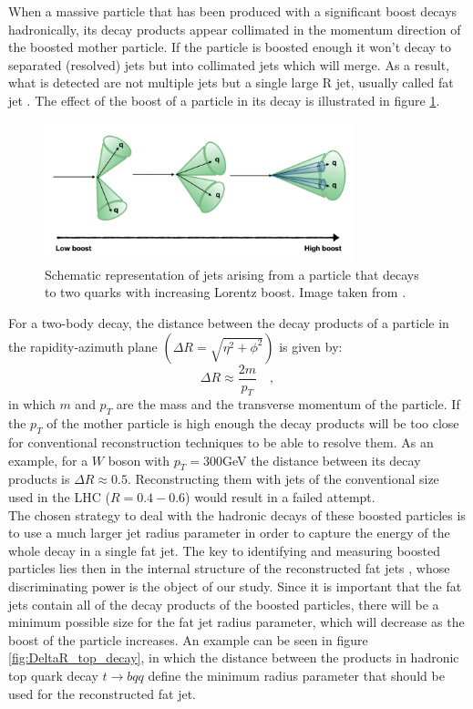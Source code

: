 \documentclass[main]{subfiles} %
\begin{document}
When a massive particle that has been produced with a significant boost decays hadronically, its decay products appear collimated in the momentum direction of the boosted mother particle. If the particle is boosted enough it won't decay to separated (resolved) jets but into collimated jets which will merge. As a result, what is detected are not multiple jets but a single large R jet, usually called fat jet \cite{Schatzel2015}. The effect of the boost of a particle in its decay is illustrated in figure \ref{fig:boosted_decay}.\\

\begin{figure}[h]
    \centering
    \includegraphics[width=0.8\textwidth]{../Figures/Theory/boosted_decay.png}
    \caption{Schematic representation of jets arising from a particle that decays to two quarks with increasing Lorentz boost. Image taken from \cite{CMSCollaboration2022}.}
    \label{fig:boosted_decay}
\end{figure}

For a two-body decay, the distance between the decay products of a particle in the rapidity-azimuth plane $\left(\Delta R = \sqrt{\eta^2 + \phi^2}\right)$ is given by:
\begin{equation}
  \Delta R \approx \frac{2m}{p_T} \quad ,
\end{equation}
in which $m$ and $p_T$ are the mass and the transverse momentum of the particle. If the $p_T$ of the mother particle is high enough the decay products will be too close for conventional reconstruction techniques to be able to resolve them. As an example, for a $W$ boson with $p_T = 300$\;GeV the distance between its decay products is $\Delta R \approx 0.5$. Reconstructing them with jets of the conventional size used in the LHC ($R = 0.4-0.6$) would result in a failed attempt.\\

The chosen strategy to deal with the hadronic decays of these boosted particles is to use a much larger jet radius parameter in order to capture the energy of the whole decay in a single fat jet. The key to identifying and measuring boosted particles lies then in the internal structure of the reconstructed fat jets \cite{ATLASCollaboration2012}, whose discriminating power is the object of our study. Since it is important that the fat jets contain all of the decay products of the boosted particles, there will be a minimum possible size for the fat jet radius parameter, which will decrease as the boost of the particle increases. An example can be seen in figure \ref{fig:DeltaR_top_decay}, in which the distance between the products in hadronic top quark decay $t \to bqq$ define the minimum radius parameter that should be used for the reconstructed fat jet.\\ 
\end{document}
